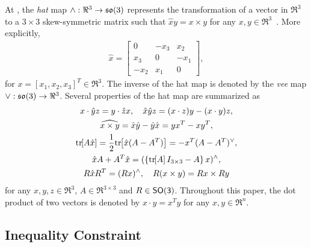 \documentclass[letterpaper, 10 pt, conference]{ieeeconf}  %
\begin{document}
At , the \textit{hat} map $\wedge :\Re^{3}\rightarrow\mathfrak{so}(3)$ represents the transformation of a vector in $\Re^3$ to a $3\times 3$ skew-symmetric matrix such that $\hat x y = x\times y$ for any $x,y\in\Re^3$~\cite{BulLew05}. More explicitly, 
\begin{align*}
\hat x = \begin{bmatrix} 0 & -x_3 & x_2 \\ x_3 & 0 & -x_1 \\ -x_2 & x_1 & 0\end{bmatrix},
\end{align*}
for $x=[x_1,x_2,x_3]^T\in\Re^3$. 
The inverse of the hat map is denoted by the \textit{vee} map $\vee:\mathfrak{so}(3)\rightarrow\Re^3$. Several properties of the hat map are summarized as
\begin{gather}
    x\cdot \hat y z = y\cdot \hat z x,\quad \hat x\hat y z = (x\cdot z) y - (x\cdot y ) z\label{eqn:STP},\\
    \widehat{x\times y} = \hat x \hat y -\hat y \hat x = yx^T-xy^T,\label{eqn:hatxy}\\
    \mathrm{tr}\negthickspace\left[ A\hat x  \right]=\frac{1}{2}\mathrm{tr}\negthickspace\left[ \hat x (A-A^T) \right]=-x^T (A-A^T)^\vee,\label{eqn:hat1}\\
    \hat x  A+A^T\hat x=(\left\{ \mathrm{tr}\negthickspace\left[ A \right]I_{3\times 3}-A \right\}x)^{\wedge},\label{eqn:xAAx}\\
R\hat x R^T = (Rx)^\wedge,\quad 
R(x\times y) = Rx\times Ry\label{eqn:RxR}
\end{gather}
for any $x,y,z\in\Re^3$, $A\in\Re^{3\times 3}$ and $R\in\mathsf{SO(3)}$. Throughout this paper, the dot product of two vectors is denoted by $x\cdot y = x^T y$ for any $x,y\in\Re^n$.


\subsection{Inequality Constraint}
\end{document}
